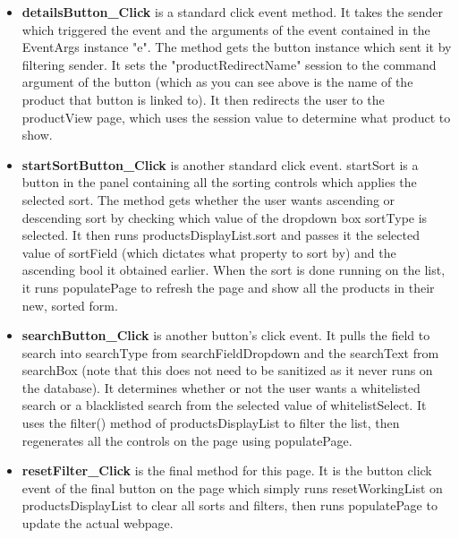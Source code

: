 ﻿\documentclass{article}
\begin{document}
\begin{itemize}
        \item \textbf{detailsButton\_Click} is a standard click event method.
        It takes the sender which triggered the event and the arguments of the event contained in the EventArgs instance "e".
        The method gets the button instance which sent it by filtering sender.
        It sets the "productRedirectName" session to the command argument of the button (which as you can see above is the name of the product that button is linked to).
        It then redirects the user to the productView page, which uses the session value to determine what product to show.
        \item \textbf{startSortButton\_Click} is another standard click event.
        startSort is a button in the panel containing all the sorting controls which applies the selected sort.
        The method gets whether the user wants ascending or descending sort by checking which value of the dropdown box sortType is selected.
        It then runs productsDisplayList.sort and passes it the selected value of sortField (which dictates what property to sort by) and the ascending bool it obtained earlier.
        When the sort is done running on the list, it runs populatePage to refresh the page and show all the products in their new, sorted form.
        \item \textbf{searchButton\_Click} is another button's click event.
        It pulls the field to search into searchType from searchFieldDropdown and the searchText from searchBox (note that this does not need to be sanitized as it never runs on the database).
        It determines whether or not the user wants a whitelisted search or a blacklisted search from the selected value of whitelistSelect.
        It uses the filter() method of productsDisplayList to filter the list, then regenerates all the controls on the page using populatePage.
        \item \textbf{resetFilter\_Click} is the final method for this page.
        It is the button click event of the final button on the page which simply runs resetWorkingList on productsDisplayList to clear all sorts and filters, then runs populatePage to update the actual webpage.
    \end{itemize}
    \newpage
\end{document}
